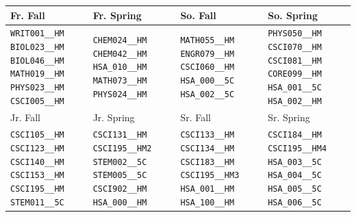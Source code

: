 \begin{tabular}{|p{}|p{}|p{}|p{}|}
    \hline
    Fr. Fall & Fr. Spring & So. Fall & So. Spring\\\hline
    \verb|WRIT001__HM| \verb|BIOL023__HM| \verb|BIOL046__HM| \verb|MATH019__HM| \verb|PHYS023__HM| \verb|CSCI005__HM|&
    \verb|CHEM024__HM| \verb|CHEM042__HM| \verb|HSA_010__HM| \verb|MATH073__HM| \verb|PHYS024__HM|&
    \verb|MATH055__HM| \verb|ENGR079__HM| \verb|CSCI060__HM| \verb|HSA_000__5C| \verb|HSA_002__5C|&
    \verb|PHYS050__HM| \verb|CSCI070__HM| \verb|CSCI081__HM| \verb|CORE099__HM| \verb|HSA_001__5C| \verb|HSA_002__HM|\\
    \hline
    Jr. Fall & Jr. Spring & Sr. Fall & Sr. Spring\\\hline
    \verb|CSCI105__HM| \verb|CSCI123__HM| \verb|CSCI140__HM| \verb|CSCI153__HM| \verb|CSCI195__HM| \verb|STEM011__5C|&
    \verb|CSCI131__HM| \verb|CSCI195__HM2| \verb|STEM002__5C| \verb|STEM005__5C| \verb|CSCI902__HM| \verb|HSA_000__HM|&
    \verb|CSCI133__HM| \verb|CSCI134__HM| \verb|CSCI183__HM| \verb|CSCI195__HM3| \verb|HSA_001__HM| \verb|HSA_100__HM|&
    \verb|CSCI184__HM| \verb|CSCI195__HM4| \verb|HSA_003__5C| \verb|HSA_004__5C| \verb|HSA_005__5C| \verb|HSA_006__5C|\\
    \hline
\end{tabular}